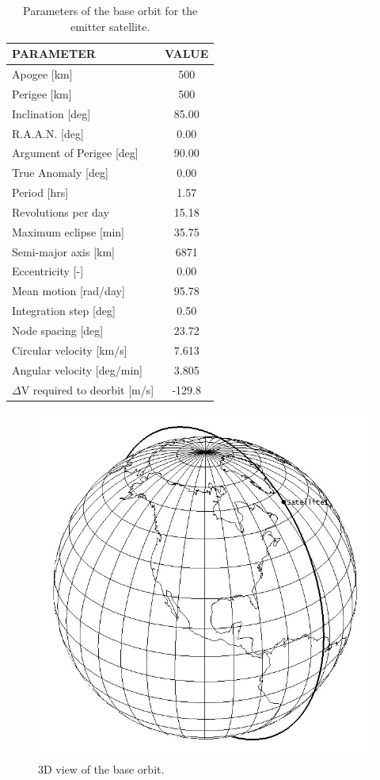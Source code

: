 \begin{table}
	\centering
		\begin{tabular}{p{5cm}|c}
		\textbf{PARAMETER} & \textbf{VALUE} \\ \hline \hline
		Apogee [km] & 500 \\
		Perigee [km] & 500 \\
		Inclination [deg] & 85.00 \\
		R.A.A.N. [deg] & 0.00 \\
		Argument of Perigee [deg] & 90.00 \\
		True Anomaly [deg] & 0.00 \\
		Period [hrs] & 1.57 \\
		Revolutions per day & 15.18 \\
		Maximum eclipse [min] & 35.75 \\
		Semi-major axis [km] & 6871 \\
		Eccentricity [-] & 0.00 \\
		Mean motion [rad/day] & 95.78 \\
		Integration step [deg] & 0.50 \\
		Node spacing [deg] & 23.72 \\
		Circular velocity [km/s] & 7.613 \\
		Angular velocity [deg/min] & 3.805 \\
		$\Delta$V required to deorbit [m/s] & -129.8 
		\end{tabular}
		\caption{Parameters of the base orbit for the emitter satellite.}
		\label{table:orbitParams}
\end{table}

\begin{figure}[h!]
\centering
\includegraphics[width=0.95\textheight, angle=90]{chapters/img/finalOrbit.png}
\caption{3D view of the base orbit.}
\label{fig:finalOrbit}
\end{figure}  

